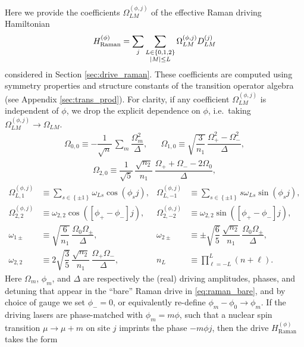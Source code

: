 \documentclass[nofootinbib,notitlepage,11pt]{revtex4-2}
\renewcommand{\t}{\text} %
\newcommand{\f}[2]{\dfrac{#1}{#2}} %
\newcommand{\p}[1]{\left(#1\right)} %
\renewcommand{\sp}[1]{\left[#1\right]} %
\renewcommand{\set}[1]{\left\{#1\right\}} %
\newcommand{\1}{\mathds{1}}
\begin{document}
Here we provide the coefficients $\Omega_{LM}^{(\phi,j)}$ of the
effective Raman driving Hamiltonian
\begin{align}
  H_{\t{Raman}}^{(\phi)}
  = \sum_j \sum_{\substack{L\in\set{0,1,2}\\\abs{M}\le L}}
  \Omega_{LM}^{(\phi,j)} D_{LM}^{(j)}
\end{align}
considered in Section \ref{sec:drive_raman}.  These coefficients are
computed using symmetry properties and structure constants of the
transition operator algebra (see Appendix \ref{sec:trans_prod}).  For
clarity, if any coefficient $\Omega_{LM}^{(\phi,j)}$ is independent of
$\phi$, we drop the explicit dependence on $\phi$, i.e.~taking
$\Omega_{LM}^{(\phi,j)}\to\Omega_{LM}$.
\begin{align}
  \Omega_{0,0} \equiv -\f1{\sqrt{n}}\,
  \sum_m\f{\Omega_m^2}{\Delta},
  &&
  \Omega_{1,0} \equiv \sqrt{\f{3}{n_1}}\,
  \f{\Omega_+^2 - \Omega_-^2}{\Delta},
  \label{eq:O_01_0}
\end{align}
\begin{align}
  \Omega_{2,0} \equiv \f1{\sqrt{5}}\, \f{\sqrt{n_2}}{n_1}\,
  \f{\Omega_+ + \Omega_- - 2\Omega_0}{\Delta},
  \label{eq:O_2_0}
\end{align}
\begin{align}
  \Omega_{L,1}^{(\phi,j)}
  &\equiv \sum_{s\in\set{\pm1}} \omega_{Ls} \cos\p{\phi_s j},
  &
  \Omega_{L,-1}^{(\phi,j)}
  &\equiv \sum_{s\in\set{\pm1}} s \omega_{Ls} \sin\p{\phi_s j}, \\
  \Omega_{2,2}^{(\phi,j)}
  &\equiv \omega_{2,2} \cos\p{\sp{\phi_+-\phi_-}j},
  &
  \Omega_{2,-2}^{(\phi,j)}
  &\equiv \omega_{2,2} \sin\p{\sp{\phi_+-\phi_-}j}, \\
  \omega_{1\pm}
  &\equiv \sqrt{\f{6}{n_1}}\, \f{\Omega_0 \Omega_\pm}{\Delta},
  &
  \omega_{2\pm}
  &\equiv \pm \sqrt{\f65}\, \f{\sqrt{n_2}}{n_1}\,
  \f{\Omega_0\Omega_\pm}{\Delta}, \\
  \omega_{2,2}
  &\equiv 2\sqrt{\f35}\, \f{\sqrt{n_2}}{n_1}\,
  \f{\Omega_+\Omega_-}{\Delta},
  &
  n_L
  &\equiv \prod_{\ell=-L}^L \p{n+\ell}.
\end{align}
Here $\Omega_m$, $\phi_m$, and $\Delta$ are respectively the (real)
driving amplitudes, phases, and detuning that appear in the ``bare''
Raman drive in \eqref{eq:raman_bare}, and by choice of gauge we set
$\phi_-=0$, or equivalently re-define $\phi_m-\phi_0\to\phi_m$.  If
the driving lasers are phase-matched with $\phi_m=m\phi$, such that a
nuclear spin transition $\mu\to\mu+m$ on site $j$ imprints the phase
$-m\phi j$, then the drive $H_{\t{Raman}}^{(\phi)}$ takes the form
\end{document}

